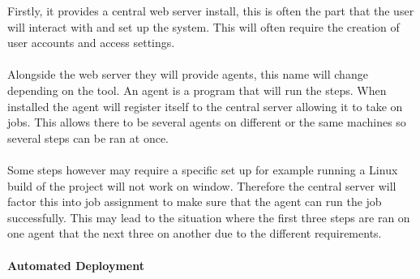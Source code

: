 Firstly, it provides a central web server install, this is often the part that the user will interact with and set up the system. This will often require the creation of user accounts and access settings.
\\\\
Alongside the web server they will provide agents, this name will change depending on the tool. An agent is a program that will run the steps. When installed the agent will register itself to the central server allowing it to take on jobs. This allows there to be several agents on different or the same machines so several steps can be ran at once.
\\\\
Some steps however may require a specific set up for example running a Linux build of the project will not work on window. Therefore the central server will factor this into job assignment to make sure that the agent can run the job successfully. This may lead to the situation where the first three steps are ran on one agent that the next three on another due to the different requirements.

\paragraph{Automated Deployment}

